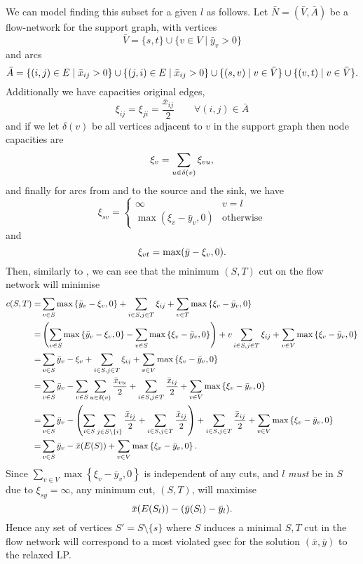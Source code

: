   We can model finding this subset for a given $l$ as follows. Let $\bar{N} = (\bar{V}, \bar{A})$ be a flow-network
  for the support graph, with vertices
  \[\bar V = \{s, t\} \cup \{v \in V \mid \bar y_v > 0 \}\]
  and arcs
  \[\bar A = \{(i, j) \in E \mid \bar x_{ij} > 0 \} \cup \{(j, i) \in E \mid \bar x_{ij} > 0\} \cup \{(s, v) \mid v \in \bar V\} \cup \{(v, t) \mid v \in \bar V\}\mathnormal{.}\]
  Additionally we have capacities original edges,
  \[\xi_{ij} = \xi_{ji} = \frac{\bar x_{ij}}{2} \qquad \forall (i,j) \in \bar A\]
  and if we let $\delta (v)$ be all vertices adjacent to $v$ in the support graph then node capacities are
  \[\xi_v = \sum_{u \in \delta(v)} \xi_{vu}\mathnormal{,}\]
  and finally
  for arcs from and to the source and the sink, we have
  $$\xi_{sv} =
  \begin{cases}
    \infty & v = l \\
    \max(\xi_v - \bar y_v, 0) & \text{otherwise}
  \end{cases}$$
  and
  \[\xi_{vt} = \max(\bar y - \xi_v, 0)\mathnormal{.}\]
  Then, similarly to \citet{padberg1983trees}, we can see that
  the minimum $(S,T)$ cut on the flow network will minimise
  \begin{align*}
    c(S,T) = &\sum_{v \in S} \max \left\{\bar y_v - \xi_v, 0\right\} +
               \sum_{i \in S, j \in T} \xi_{ij} +
               \sum_{v \in T} \max\left\{\xi_v - \bar y_v, 0\right\} \\
    =&\left(\sum_{v \in S} \max \left\{\bar y_v - \xi_v, 0\right\} - \sum_{v \in S} \max\left\{\xi_v - \bar y_v, 0\right\} \right) +
v       \sum_{i \in S, j \in T}  \xi_{ij} +
       \sum_{v \in V} \max\left\{\xi_v - \bar y_v, 0\right\} \\
    =&\sum_{v \in S} \bar y_v - \xi_v +
       \sum_{i \in S, j \in T} \xi_{ij} +
       \sum_{v \in V} \max\left\{\xi_v - \bar y_v, 0\right\} \\
    =&\sum_{v \in S} \bar y_v -
       \sum_{v \in S} \sum_{u \in \delta(v)} \frac{\bar x_{vu}}{2} +
       \sum_{i \in S, j \in T} \frac{\bar x_{ij}}{2} +
       \sum_{v \in V} \max\left\{\xi_v - \bar y_v, 0\right\} \\
    =&\sum_{v \in S} \bar y_v -
       \left(\sum_{i \in S} \sum_{j \in S \setminus \{i\}} \frac{\bar x_{ij}}{2} +
       \sum_{i \in S, j \in T} \frac{\bar x_{ij}}{2}\right) +
       \sum_{i \in S, j \in T} \frac{\bar x_{ij}}{2} +
       \sum_{v \in V} \max\left\{\xi_v - \bar y_v, 0\right\} \\
    =&\sum_{v \in S} \bar y_v -
       \bar x (E(S)) +
       \sum_{v \in V} \max\left\{\xi_v - \bar y_v, 0\right\}\mathnormal{.}
  \end{align*}
  Since $\sum_{v \in V} \max\left\{\xi_v - \bar y_v, 0\right\}$ is independent of
  any cuts, and
  $l$ \textit{must} be in $S$ due to $\xi_{sy} = \infty$, any minimum cut, $(S,T)$, will maximise
  \[\bar x (E(S_l)) - (\bar y (S_l) - \bar y_l)\mathnormal{.}\]
  Hence any set of vertices $S' = S \setminus \{s\}$ where $S$ induces a minimal $S,T$ cut in the flow network will correspond to
  a most violated \gls{gsec} for the solution $(\bar x, \bar y)$ to the relaxed LP.

